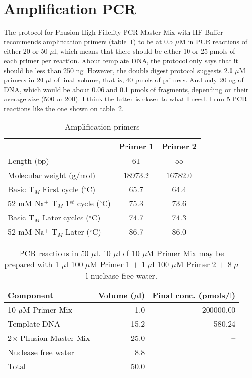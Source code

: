 \documentclass[a4paper,12pt]{article}
\begin{document}
\section{Amplification PCR}
The protocol for Phusion High-Fidelity PCR Master Mix with HF Buffer recommends amplification primers (table~\ref{tau:primers}) to be at 0.5 $\mu$M in PCR reactions of either 20 or 50 $\mu$l, which means that there should be either 10 or 25 pmols of each primer per reaction. About template DNA, the protocol only says that it should be less than 250 ng. However, the double digest protocol suggests 2.0 $\mu$M primers in 20 $\mu$l of final volume; that is, 40 pmols of primers. And only 20 ng of DNA, which would be about 0.06 and 0.1 pmols of fragments, depending on their average size (500 or 200). I think the latter is closer to what I need. I run 5 PCR reactions like the one shown on table~\ref{tau:PCR}.

\begin{table}
\begin{center}
\caption{Amplification primers}\label{tau:primers}
\vspace*{0.2cm}
\begin{tabular}{lcc}
\toprule
&Primer 1&Primer 2\\
\midrule
Length (bp)&61&55\\
Molecular weight (g/mol)&18973.2&16782.0\\
Basic T$_M$ First cycle ($^{\circ}$C)&65.7&64.4\\
52 mM Na$^{+}$ T$_M$ 1$^{st}$ cycle ($^{\circ}$C)&75.3&73.6\\
Basic T$_M$ Later cycles ($^{\circ}$C)&74.7&74.3\\
52 mM Na$^{+}$ T$_M$ Later ($^{\circ}$C)&86.7&86.0\\
\bottomrule
\end{tabular}
\end{center}
\end{table}

\begin{table}
\begin{center}
\caption{PCR reactions in 50 $\mu$l. 10 $\mu$l of 10 $\mu$M Primer Mix may be prepared with 1 $\mu$l 100 $\mu$M Primer 1 $+$ 1 $\mu$l 100 $\mu$M Primer 2 $+$ 8 $\mu$l nuclease-free water.}\label{tau:PCR}
\vspace*{0.2cm}
\begin{tabular}{lrr}
\toprule
Component&Volume ($\mu$l)&Final conc. (pmols/l)\\
\midrule
10 $\mu$M Primer Mix&1.0&200000.00\\
Template DNA&15.2&580.24\\
2$\times$ Phusion Master Mix&25.0&--\\
Nuclease free water&8.8&--\\
\midrule
Total&50.0&\\
\bottomrule
\end{tabular}
\end{center}
\end{table}
\end{document}
